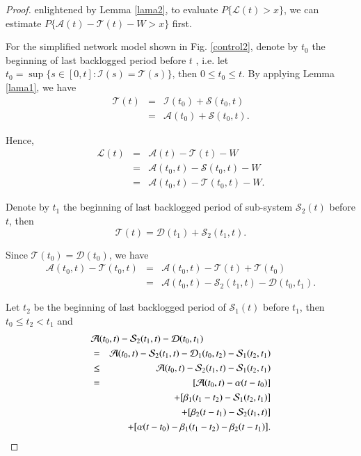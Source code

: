 \documentclass[paper]{ieice}
\newtheorem{proof}{Proof}
\begin{document}
\begin{proof}
enlightened by Lemma \ref{lama2}, to evaluate $P\{\mathcal{L}(t)>x\}$, we can estimate $P\{\mathcal{A}(t)-\mathcal{T}(t)-W>x\}$ first.

For the simplified network model shown in Fig. \ref{control2}, denote by $t_{0}$ the beginning of last backlogged period before $t$ \cite{Fidl06}, i.e. let $t_0=\sup\{s\in[0,t]:\mathcal{I}(s)=\mathcal{T}(s)\}$, then $0\leq t_{0}\leq t$. By applying Lemma \ref{lama1}, we have
\begin{eqnarray*}
  \mathcal{T}(t)&=&\mathcal{I}(t_{0})+\mathcal{S}(t_{0},t)\\
  &=& \mathcal{A}(t_{0})+\mathcal{S}(t_{0},t).
\end{eqnarray*}

Hence,
\begin{eqnarray}
\mathcal{L}(t)&=&\mathcal{A}(t)-\mathcal{T}(t)-W\nonumber\\
&=&\mathcal{A}(t_0,t)-\mathcal{S}(t_0,t)-W\label{used4theorem5}\\
&=&\mathcal{A}(t_0,t)-\mathcal{T}(t_0,t)-W\nonumber.
\end{eqnarray}

Denote by $t_1$ the beginning of last backlogged period of sub-system $\mathcal{S}_2(t)$ before $t$, then
$$\mathcal{T}(t)=\mathcal{D}(t_1)+\mathcal{S}_2(t_1,t).$$

Since $\mathcal{T}(t_0)=\mathcal{D}(t_0)$, we have
\begin{eqnarray*}
\mathcal{A}(t_0,t)-\mathcal{T}(t_0,t) &=& \mathcal{A}(t_0,t)-\mathcal{T}(t)+\mathcal{T}(t_0)\\
&=& \mathcal{A}(t_0,t)-\mathcal{S}_2(t_1,t)-\mathcal{D}(t_0,t_1).
\end{eqnarray*}

Let $t_2$ be the beginning of last backlogged period of $\mathcal{S}_1(t)$ before $t_1$, then $t_0\leq t_2< t_1$ and
\begin{eqnarray}
\lefteqn{\mathcal{A}(t_0,t)-\mathcal{S}_2(t_1,t)-\mathcal{D}(t_0,t_1)}\nonumber\\
&=& \mathcal{A}(t_0,t)-\mathcal{S}_2(t_1,t)-\mathcal{D}_1(t_0,t_2)-\mathcal{S}_1(t_2,t_1)\nonumber\\
&\leq& \mathcal{A}(t_0,t)-\mathcal{S}_2(t_1,t)-\mathcal{S}_1(t_2,t_1)\label{used4effec}\\
&=& [\mathcal{A}(t_0,t)-\alpha(t-t_0)]\nonumber\\
&& +[\beta_1(t_1-t_2)-\mathcal{S}_1(t_2,t_1)]\nonumber\\
&& +[\beta_2(t-t_1)-\mathcal{S}_2(t_1,t)]\nonumber\\
&& +[\alpha(t-t_0)-\beta_1(t_1-t_2)-\beta_2(t-t_1)].\label{initial}
\end{eqnarray}


\end{proof}
\end{document}
